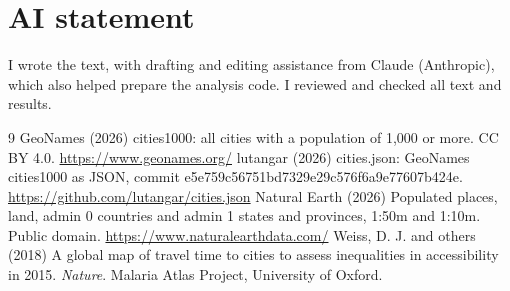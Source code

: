 \documentclass[11pt,a4paper]{article}
\begin{document}
\section*{AI statement}
I wrote the text, with drafting and editing assistance from Claude (Anthropic), which also helped prepare the analysis code. I reviewed and checked all text and results.

\begin{thebibliography}{9}
 GeoNames (2026) cities1000: all cities with a population of 1,000 or more. CC BY 4.0. \url{https://www.geonames.org/}
 lutangar (2026) cities.json: GeoNames cities1000 as JSON, commit e5e759c56751bd7329e29c576f6a9e77607b424e. \url{https://github.com/lutangar/cities.json}
 Natural Earth (2026) Populated places, land, admin 0 countries and admin 1 states and provinces, 1:50m and 1:10m. Public domain. \url{https://www.naturalearthdata.com/}
 Weiss, D. J. and others (2018) A global map of travel time to cities to assess inequalities in accessibility in 2015. \textit{Nature}. Malaria Atlas Project, University of Oxford.
\end{thebibliography}
\end{document}

